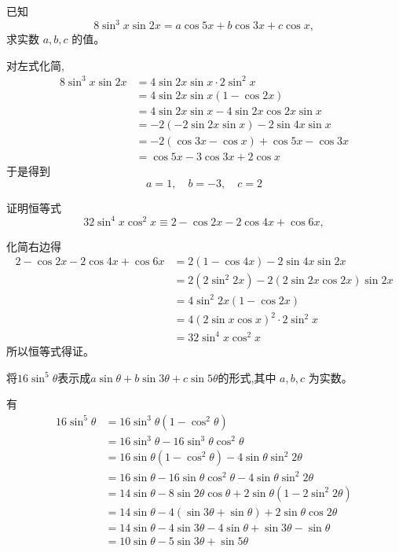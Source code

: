\begin{questions}
    \question 已知
    \[
    8 \sin^3 x \sin 2x = a \cos 5x + b \cos 3x + c \cos x,
    \]
    求实数 $a, b, c$ 的值。
    \begin{solution}
    \noindent
        对左式化简,
        \begin{align*} 
        8 \sin^3 x \sin 2x 
        &= 4 \sin 2x \sin x \cdot 2 \sin^2 x \\ 
        &= 4 \sin 2x \sin x (1 - \cos 2x) \\ 
        &= 4 \sin 2x \sin x - 4 \sin 2x \cos 2x \sin x \\ 
        &= -2 (-2 \sin 2x \sin x) - 2 \sin 4x \sin x \\ 
        &= -2 (\cos 3x - \cos x) + \cos 5x - \cos 3x \\ 
        &= \cos 5x - 3 \cos 3x + 2 \cos x
        \end{align*}
        于是得到
        \[
        a = 1, \quad b = -3, \quad c = 2
        \]
    \end{solution}

    \question 证明恒等式
    \[
    32 \sin^4 x \cos^2 x \equiv 2 - \cos 2x - 2 \cos 4x + \cos 6x,
    \]
    \begin{solution}
        化简右边得
        \begin{align*}
        2 - \cos 2x - 2 \cos 4x + \cos 6x 
        &= 2(1 - \cos 4x) - 2 \sin 4x \sin 2x \\
        &= 2(2 \sin^2 2x) - 2 (2 \sin 2x \cos 2x) \sin 2x \\
        &= 4 \sin^2 2x (1 - \cos 2x) \\
        &= 4 (2 \sin x \cos x)^2 \cdot 2 \sin^2 x \\
        &= 32 \sin^4 x \cos^2 x
        \end{align*}
        所以恒等式得证。
    \end{solution}

    \question 将$16 \sin^5 \theta $表示成$a \sin \theta + b \sin 3\theta + c \sin 5\theta$的形式,其中 $a, b, c$ 为实数。
    \begin{solution}
        有
        \begin{align*}
        16 \sin^5 \theta 
        &= 16 \sin^3 \theta (1 - \cos^2 \theta) \\
        &= 16 \sin^3 \theta - 16 \sin^3 \theta \cos^2 \theta \\
        &= 16 \sin \theta (1 - \cos^2 \theta) - 4 \sin \theta \sin^2 2\theta \\
        &= 16 \sin \theta - 16 \sin \theta \cos^2 \theta - 4 \sin \theta \sin^2 2\theta \\
        &= 14 \sin \theta - 8 \sin 2\theta \cos \theta + 2 \sin \theta (1 - 2 \sin^2 2\theta) \\
        &= 14 \sin \theta - 4 (\sin 3\theta + \sin \theta) + 2 \sin \theta \cos 2\theta \\
        &= 14 \sin \theta - 4 \sin 3\theta - 4 \sin \theta + \sin 3\theta - \sin \theta \\
        &= 10 \sin \theta - 5 \sin 3\theta + \sin 5\theta
        \end{align*}
    \end{solution}


\end{questions}
